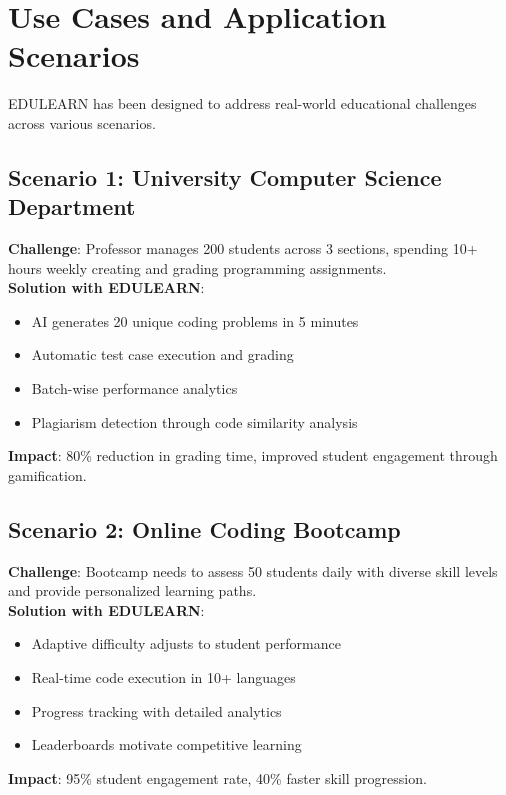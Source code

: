 \documentclass[conference]{IEEEtran}
\begin{document}
\section{Use Cases and Application Scenarios}

EDULEARN has been designed to address real-world educational challenges across various scenarios.

\subsection{Scenario 1: University Computer Science Department}
\textbf{Challenge}: Professor manages 200 students across 3 sections, spending 10+ hours weekly creating and grading programming assignments. \\
\textbf{Solution with EDULEARN}:
\begin{itemize}
    \item AI generates 20 unique coding problems in 5 minutes
    \item Automatic test case execution and grading
    \item Batch-wise performance analytics
    \item Plagiarism detection through code similarity analysis
\end{itemize}
\textbf{Impact}: 80\% reduction in grading time, improved student engagement through gamification.

\subsection{Scenario 2: Online Coding Bootcamp}
\textbf{Challenge}: Bootcamp needs to assess 50 students daily with diverse skill levels and provide personalized learning paths. \\
\textbf{Solution with EDULEARN}:
\begin{itemize}
    \item Adaptive difficulty adjusts to student performance
    \item Real-time code execution in 10+ languages
    \item Progress tracking with detailed analytics
    \item Leaderboards motivate competitive learning
\end{itemize}
\textbf{Impact}: 95\% student engagement rate, 40\% faster skill progression.
\end{document}
